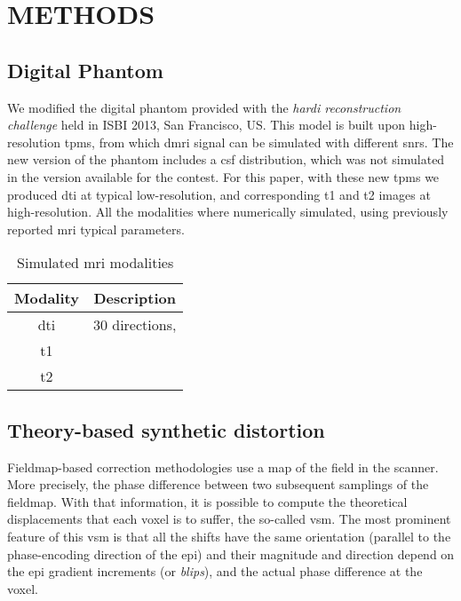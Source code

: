 \section{METHODS}

\subsection{Digital Phantom}
We modified the digital phantom provided with the
\emph{\gls*{hardi} reconstruction challenge} held
in ISBI 2013, San Francisco, US. This model is
built upon high-resolution \glspl*{tpm}, from which
\gls*{dmri} signal can be simulated with different
\glspl*{snr}. The new version of the phantom includes
a \gls*{csf} distribution, which was not simulated
in the version available for the contest. For this paper,
with these new \glspl*{tpm} we produced \gls*{dti} at
typical low-resolution, and corresponding \gls*{t1} and 
\gls*{t2} images at high-resolution. All the
modalities where numerically simulated, using previously
reported \gls*{mri} typical parameters.


\begin{table}[h]
\caption{Simulated \gls*{mri} modalities}
\label{table:phantom}
\begin{center}
\begin{tabular}{c|c}
\hline
Modality & Description \\
\hline
\gls*{dti} & 30 directions, \\
\hline
\gls*{t1} & \\
\hline
\gls*{t2} & \\
\hline
\end{tabular}
\end{center}
\end{table}


\subsection{Theory-based synthetic distortion}

Fieldmap-based correction methodologies
\cite{jezzard_correction_1995} use a map
of the field in the scanner. More precisely, the
phase difference between two subsequent samplings
of the fieldmap. With that information, it is possible
to compute the theoretical displacements that each
voxel is to suffer, the so-called \gls*{vsm}. The
most prominent feature of this \gls*{vsm} is that all
the shifts have the same orientation (parallel to the
phase-encoding direction of the \gls*{epi}) and their
magnitude and direction depend on the \gls*{epi} 
gradient increments (or \emph{blips}), and the actual
phase difference at the voxel.

